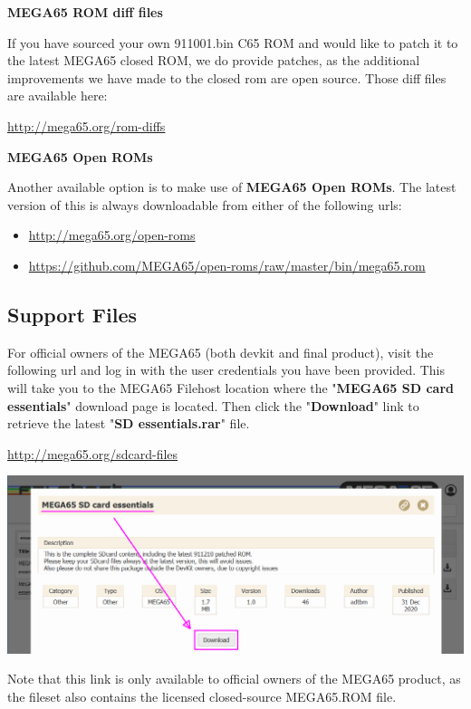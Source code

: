 \textbf{MEGA65 ROM diff files}

If you have sourced your own 911001.bin C65 ROM and would like to patch it to the latest MEGA65 closed ROM,
we do provide patches, as the additional improvements we have made to the closed rom are open source.
Those diff files are available here:

\url{http://mega65.org/rom-diffs}

\textbf{MEGA65 Open ROMs}

Another available option is to make use of \textbf{MEGA65 Open ROMs}. The latest version of this is always downloadable from either of the following urls:

\begin{itemize}
  \item \url{http://mega65.org/open-roms}
  \item \url{https://github.com/MEGA65/open-roms/raw/master/bin/mega65.rom}
\end{itemize}


\subsection{Support Files}

For official owners of the MEGA65 (both devkit and final product), visit the following url and log in with the user credentials you have been provided. This will take you to the MEGA65 Filehost location where the "\textbf{MEGA65 SD card essentials}" download page is located. Then click the "\textbf{Download}" link to retrieve the latest "\textbf{SD essentials.rar}" file.

\url{http://mega65.org/sdcard-files}

\includegraphics[width=\linewidth]{images/latest_support_files_with_closedrom.png}

Note that this link is only available to official owners of the MEGA65 product, as the fileset also contains the licensed closed-source MEGA65.ROM file.

